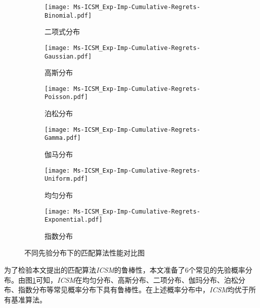 \begin{figure}[!htb]
	\centering
	\begin{subfigure}[t]{0.49\linewidth}
		\captionsetup{justification=centering} %
		\begin{minipage}[b]{1\linewidth}
			\texttt{[image: Ms-ICSM\_Exp-Imp-Cumulative-Regrets-Binomial.pdf]}
			\caption{二项式分布}
		\end{minipage}
	\end{subfigure}
	\begin{subfigure}[t]{0.49\linewidth}
		\captionsetup{justification=centering} %
		\begin{minipage}[b]{1\linewidth}
			\texttt{[image: Ms-ICSM\_Exp-Imp-Cumulative-Regrets-Gaussian.pdf]}
			\caption{高斯分布}
		\end{minipage}
	\end{subfigure}
	\begin{subfigure}[t]{0.49\linewidth}
		\captionsetup{justification=centering} %
		\begin{minipage}[b]{1\linewidth}
			\texttt{[image: Ms-ICSM\_Exp-Imp-Cumulative-Regrets-Poisson.pdf]}
			\caption{泊松分布}
		\end{minipage}
	\end{subfigure}
	\begin{subfigure}[t]{0.49\linewidth}
		\captionsetup{justification=centering} %
		\begin{minipage}[b]{1\linewidth}
			\texttt{[image: Ms-ICSM\_Exp-Imp-Cumulative-Regrets-Gamma.pdf]}
			\caption{伽马分布}
		\end{minipage}
	\end{subfigure}
	\begin{subfigure}[t]{0.49\linewidth}
		\captionsetup{justification=centering} %
		\begin{minipage}[b]{1\linewidth}
			\texttt{[image: Ms-ICSM\_Exp-Imp-Cumulative-Regrets-Uniform.pdf]}
			\caption{均匀分布}
		\end{minipage}
	\end{subfigure}
	\begin{subfigure}[t]{0.49\linewidth}
		\captionsetup{justification=centering} %
		\begin{minipage}[b]{1\linewidth}
			\texttt{[image: Ms-ICSM\_Exp-Imp-Cumulative-Regrets-Exponential.pdf]}
			\caption{指数分布}
		\end{minipage}
	\end{subfigure}
	\caption{不同先验分布下的匹配算法性能对比图}
	\label{Fig:Exp-Imp-Cumulative-Regrets}
\end{figure}
为了检验本文提出的匹配算法\emph{ICSM}的鲁棒性，本文准备了6个常见的先验概率分布。由图\ref{Fig:Exp-Imp-Cumulative-Regrets}可知，\emph{ICSM}在均匀分布、高斯分布、二项分布、伽玛分布、泊松分布、指数分布等常见概率分布下具有鲁棒性。在上述概率分布中，\emph{ICSM}均优于所有基准算法。



